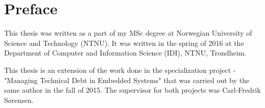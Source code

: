 \section*{\Huge Preface}
This thesis was written as a part of my MSc degree at Norwegian University of Science and Technology (NTNU). It was written in the spring of 2016 at the Department of Computer and Information Science (IDI), NTNU, Trondheim.

This thesis is an extension of the work done in the specialization project - "Managing Technical Debt in Embedded Systems" that was carried out by the same author in the fall of 2015. The supervisor for both projects was Carl-Fredrik Sørensen.